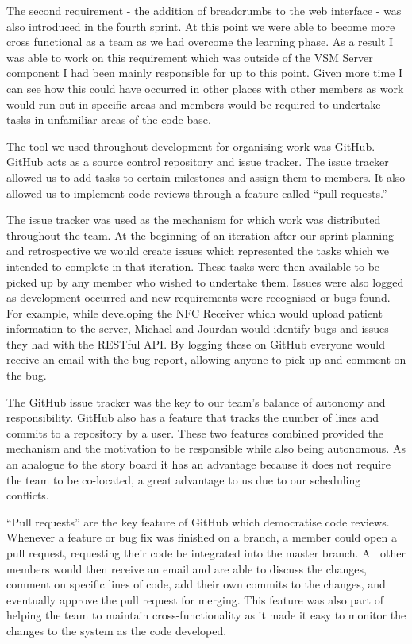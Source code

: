 \documentclass[conference]{IEEEtran}
\begin{document}
The second requirement - the addition of breadcrumbs to the web interface - was
also introduced in the fourth sprint. At this point we were able to become more
cross functional as a team as we had overcome the learning phase. As a result I
was able to work on this requirement which was outside of the VSM Server
component I had been mainly responsible for up to this point. Given more time I
can see how this could have occurred in other places with other members as work
would run out in specific areas and members would be required to undertake tasks
in unfamiliar areas of the code base.

The tool we used throughout development for organising work was GitHub. GitHub
acts as a source control repository and issue tracker. The issue tracker allowed
us to add tasks to certain milestones and assign them to members. It also
allowed us to implement code reviews through a feature called ``pull requests.''

The issue tracker was used as the mechanism for which work was distributed
throughout the team. At the beginning of an iteration after our sprint planning
and retrospective we would create issues which represented the tasks which we
intended to complete in that iteration. These tasks were then available to be
picked up by any member who wished to undertake them. Issues were also logged as
development occurred and new requirements were recognised or bugs found. For
example, while developing the NFC Receiver which would upload patient
information to the server, Michael and Jourdan would identify bugs and issues
they had with the RESTful API. By logging these on GitHub everyone would receive
an email with the bug report, allowing anyone to pick up and comment on the bug.

The GitHub issue tracker was the key to our team's balance of autonomy and
responsibility. GitHub also has a feature that tracks the number of lines and
commits to a repository by a user. These two features combined provided the
mechanism and the motivation to be responsible while also being autonomous. As
an analogue to the story board it has an advantage because it does not require
the team to be co-located, a great advantage to us due to our scheduling
conflicts.

``Pull requests'' are the key feature of GitHub which democratise code reviews.
Whenever a feature or bug fix was finished on a branch, a member could open a
pull request, requesting their code be integrated into the master branch. All
other members would then receive an email and are able to discuss the changes,
comment on specific lines of code, add their own commits to the changes, and
eventually approve the pull request for merging. This feature was also part of
helping the team to maintain cross-functionality as it made it easy to monitor
the changes to the system as the code developed.
\end{document}
